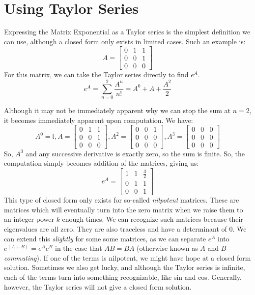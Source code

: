 \section{Using Taylor Series}
Expressing the Matrix Exponential as a Taylor series is the simplest definition we can use, although a closed form only exists in limited cases. Such an example is:
$$A=\begin{bmatrix}
    0&1&1\\0&0&1\\
    0&0&0
\end{bmatrix}$$
For this matrix, we can take the Taylor series directly to find $e^A$.
\begin{equation}\label{eq:eA taylor series}
    e^A=\sum_{n=0}^2{\frac{A^n}{n!}}=A^0+A+\frac{A^2}{2}
\end{equation}

Although it may not be immediately apparent why we can stop the sum at $n=2$, it becomes immediately apparent upon computation. We have:
$$A^0=\mathbb{I},A=\begin{bmatrix}
    0&1&1\\0&0&1\\
    0&0&0
\end{bmatrix},A^2=\begin{bmatrix}
    0&0&1\\0&0&0\\
    0&0&0
\end{bmatrix},A^3=\begin{bmatrix}
    0&0&0\\0&0&0\\
    0&0&0
\end{bmatrix}$$
So, $A^3$ and any successive derivative is exactly zero, so the sum is finite. So, the computation simply becomes addition of the matrices, giving us:
$$e^A=\begin{bmatrix}
    1&1&\frac{3}{2}\\0&1&1\\
    0&0&1
\end{bmatrix}$$
This type of closed form only exists for so-called \textit{nilpotent} matrices. These are matrices which will eventually turn into the zero matrix when we raise them to an integer power $k$ enough times. We can recognize such matrices because their eigenvalues are all zero. They are also traceless and have a determinant of 0. We can extend this \textit{slightly} for some some matrices, as we can separate $e^A$ into $e^{(A+B)}=e^Ae^B$ in the case that $AB=BA$ (otherwise known as $A$ and $B$ \textit{commuting}). If one of the terms is nilpotent, we might have hope at a closed form solution. Sometimes we also get lucky, and although the Taylor series is infinite, each of the terms turn into something recognizable, like sin and cos. Generally, however, the Taylor series will not give a closed form solution.

